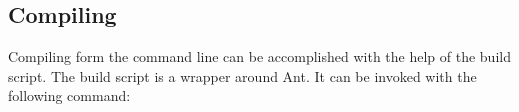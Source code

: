 %

\subsection{Compiling \ExTeX}\label{sec:shell-compile}

Compiling \ExTeX form the command line can be accomplished with the
help of the build script. The build script is a wrapper around Ant. It
can be invoked with the following command:

